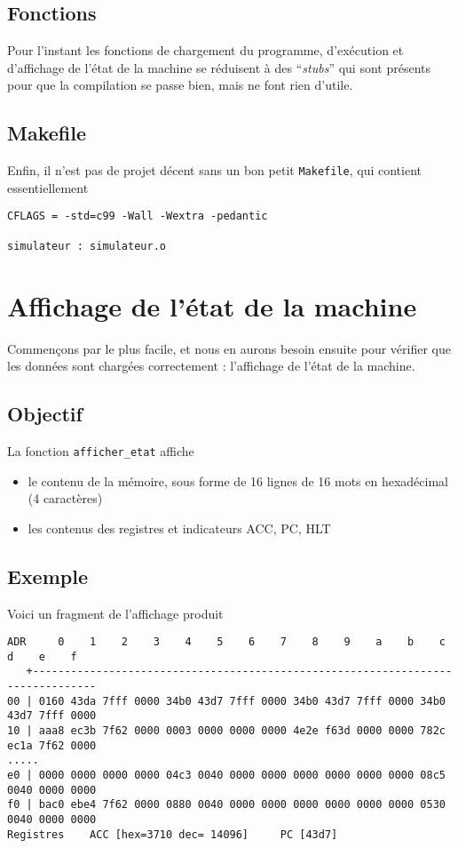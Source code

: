 \documentclass[10pt]{article}
\begin{document}
\subsection{Fonctions}
Pour l'instant les fonctions de chargement du programme, d'exécution et d'affichage
de l'état de la machine se réduisent à des ``\emph{stubs}'' qui sont présents pour que la compilation se passe bien, 
mais ne font rien d'utile.

\subsection{Makefile}

Enfin, il n'est pas de projet décent sans un bon petit \texttt{Makefile}, qui
contient essentiellement

\begin{lstlisting}[style=makefile]
CFLAGS = -std=c99 -Wall -Wextra -pedantic

simulateur : simulateur.o
\end{lstlisting}

\section{Affichage de l'état de la machine}

Commençons par le plus facile, et nous en aurons besoin ensuite pour
vérifier que les données sont chargées correctement : l'affichage de
l'état de la machine.

\subsection{Objectif}
La fonction \texttt{afficher\_etat} affiche
\begin{itemize}
\item le contenu de la mémoire, sous forme de 16 lignes de 16 mots en hexadécimal (4 caractères)
\item  les contenus des registres et indicateurs ACC, PC, HLT
\end{itemize}

\subsection{Exemple}
Voici un fragment de l'affichage produit
{\small
\begin{verbatim}
ADR     0    1    2    3    4    5    6    7    8    9    a    b    c    d    e    f
   +--------------------------------------------------------------------------------
00 | 0160 43da 7fff 0000 34b0 43d7 7fff 0000 34b0 43d7 7fff 0000 34b0 43d7 7fff 0000 
10 | aaa8 ec3b 7f62 0000 0003 0000 0000 0000 4e2e f63d 0000 0000 782c ec1a 7f62 0000 
.....
e0 | 0000 0000 0000 0000 04c3 0040 0000 0000 0000 0000 0000 0000 08c5 0040 0000 0000 
f0 | bac0 ebe4 7f62 0000 0880 0040 0000 0000 0000 0000 0000 0000 0530 0040 0000 0000 
Registres    ACC [hex=3710 dec= 14096]     PC [43d7]
\end{verbatim}
}
\end{document}
